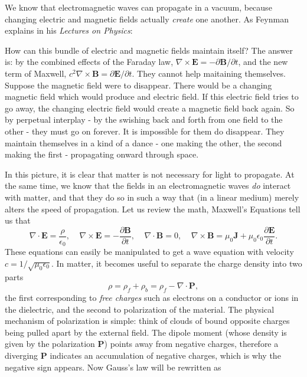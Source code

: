 We know that electromagnetic waves can propagate in a vacuum, because changing electric and magnetic fields actually \textit{create} one another. As Feynman explains in his \textit{Lectures on Physics}:
\begin{displayquote}
How can this bundle of electric and magnetic fields maintain itself? The answer is: by the combined effects of the Faraday law, $\nabla\times\textbf{E}=-\partial\textbf{B}/\partial t$, and the new term of Maxwell, $c^2\nabla\times\textbf{B}=\partial\textbf{E}/\partial t$. They cannot help maitaining themselves. Suppose the magnetic field were to disappear. There would be a changing magnetic field which would produce and electric field. If this electric field tries to go away, the changing electric field would create a magnetic field back again. So by perpetual interplay - by the swishing back and forth from one field to the other - they must go on forever. It is impossible for them do disappear. They maintain themselves in a kind of a dance - one making the other, the second making the first - propagating onward through space.
\end{displayquote}
In this picture, it is clear that matter is not necessary for light to propagate. At the same time, we know that the fields in an electromagnetic waves \textit{do} interact with matter, and that they do so in such a way that (in a linear medium) merely alters the speed of propagation. Let us review the math, Maxwell's Equations tell us that
\begin{equation}
    \nabla\cdot\textbf{E}=\frac{\rho}{\epsilon_0},\;\;\;\;\nabla\times\textbf{E}=-\frac{\partial \textbf{B}}{\partial t},\;\;\;\;\nabla\cdot\textbf{B}=0,\;\;\;\;\nabla\times\textbf{B}=\mu_0\textbf{J}+\mu_0\epsilon_0\frac{\partial \textbf{E}}{\partial t}.
\end{equation}
These equations can easily be manipulated to get a wave equation with velocity $c=1/\sqrt{\mu_0\epsilon_0}$. In matter, it becomes useful to separate the charge density into two parts
\begin{equation}
    \rho=\rho_f+\rho_b=\rho_f-\nabla\cdot\textbf{P},
\end{equation}
the first corresponding to \textit{free charges} such as electrons on a conductor or ions in the dielectric, and the second to polarization of the material. The physical mechanism of polarization is simple: think of clouds of bound opposite charges being pulled apart by the external field. The dipole moment (whose density is given by the polarization \textbf{P}) points away from negative charges, therefore a diverging \textbf{P} indicates an accumulation of negative charges, which is why the negative sign appears. Now Gauss's law will be rewritten as
